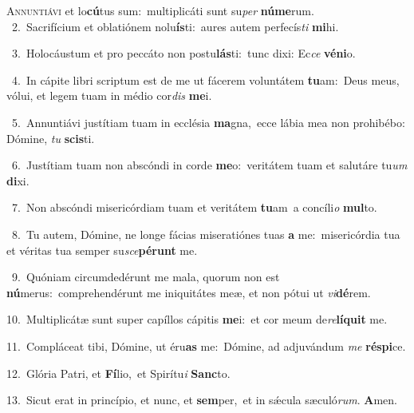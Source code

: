 \lettrine{\initial\textcolor{\initialcolor}{A}}{nnuntiávi} et lo\-\textbf{cú}\-tus sum:~\star multiplicáti sunt su\textit{per} \textbf{nú}\-\textbf{me}rum.\\
{\numbfont\textcolor{\numbcolor}{~2.}}~Sacrifícium et oblatiónem nolu\-\textbf{ís}\-ti:~\star aures autem perfecís\textit{ti} \textbf{mi}\-hi.\par
{\numbfont\textcolor{\numbcolor}{~3.}}~Holocáustum et pro peccáto non postu\-\textbf{lás}\-ti:~\star tunc dixi: Ec\textit{ce} \textbf{vé}\-\textbf{ni}o.\par
{\numbfont\textcolor{\numbcolor}{~4.}}~In cápite libri scriptum est de me ut fácerem voluntátem \textbf{tu}\-am:~\star Deus meus, vólui, et legem tuam in médio cor\textit{dis} \textbf{me}\-i.\par
{\numbfont\textcolor{\numbcolor}{~5.}}~Annuntiávi justítiam tuam in ecclésia \textbf{ma}\-gna,~\star ecce lábia mea non prohibébo: Dómine, \textit{tu} \textbf{scis}\-ti.\par
{\numbfont\textcolor{\numbcolor}{~6.}}~Justítiam tuam non abscóndi in corde \textbf{me}\-o:~\star veritátem tuam et salutáre tu\textit{um} \textbf{di}\-xi.\par
{\numbfont\textcolor{\numbcolor}{~7.}}~Non abscóndi misericórdiam tuam et veritátem \textbf{tu}\-am~\star a concíli\textit{o} \textbf{mul}\-to.\par
{\numbfont\textcolor{\numbcolor}{~8.}}~Tu autem, Dómine, ne longe fácias miseratiónes tuas \textbf{a} me:~\star misericórdia tua et véritas tua semper su\-\textit{sce}\-\textbf{pé}\textbf{runt} me.\par
{\numbfont\textcolor{\numbcolor}{~9.}}~Quóniam circumdedérunt me mala, quorum non est \textbf{nú}\-merus:~\star comprehendérunt me iniquitátes meæ, et non pótui ut \textit{vi}\-\textbf{dé}rem.\par
{\numbfont\textcolor{\numbcolor}{10.}}~Multiplicátæ sunt super capíllos cápitis \textbf{me}\-i:~\star et cor meum de\-\textit{re}\-\textbf{lí}\textbf{quit} me.\par
{\numbfont\textcolor{\numbcolor}{11.}}~Compláceat tibi, Dómine, ut éru\textbf{as} me:~\star Dómine, ad adjuvándum \textit{me} \textbf{ré}\-\textbf{spi}ce.\par
{\numbfont\textcolor{\numbcolor}{12.}}~Glória Patri, et \textbf{Fí}\-lio,~\star et Spirítu\textit{i} \textbf{Sanc}\-to.\par
{\numbfont\textcolor{\numbcolor}{13.}}~Sicut erat in princípio, et nunc, et \textbf{sem}\-per,~\star et in sǽcula sæculó\-\textit{rum}\-. \textbf{A}\-men.\par

